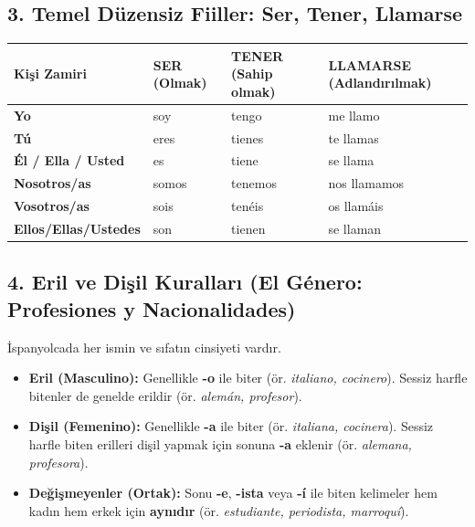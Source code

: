 \documentclass[12pt,a4paper]{article}
\begin{document}
\subsection{3. Temel Düzensiz Fiiller: Ser, Tener, Llamarse}
\begin{table}[h]
\centering
\begin{tabularx}{\textwidth}{l X X X}
\toprule
\textbf{Kişi Zamiri} & \textbf{SER (Olmak)} & \textbf{TENER (Sahip olmak)} & \textbf{LLAMARSE (Adlandırılmak)} \\
\midrule
\textbf{Yo} & soy & tengo & me llamo \\
\textbf{Tú} & eres & tienes & te llamas \\
\textbf{Él / Ella / Usted} & es & tiene & se llama \\
\textbf{Nosotros/as} & somos & tenemos & nos llamamos \\
\textbf{Vosotros/as} & sois & tenéis & os llamáis \\
\textbf{Ellos/Ellas/Ustedes} & son & tienen & se llaman \\
\bottomrule
\end{tabularx}
\end{table}

\subsection{4. Eril ve Dişil Kuralları (El Género: Profesiones y Nacionalidades)}
İspanyolcada her ismin ve sıfatın cinsiyeti vardır.
\begin{itemize}
    \item \textbf{Eril (Masculino):} Genellikle \textbf{-o} ile biter (ör. \textit{italiano, cocinero}). Sessiz harfle bitenler de genelde erildir (ör. \textit{alemán, profesor}).
    \item \textbf{Dişil (Femenino):} Genellikle \textbf{-a} ile biter (ör. \textit{italiana, cocinera}). Sessiz harfle biten erilleri dişil yapmak için sonuna \textbf{-a} eklenir (ör. \textit{alemana, profesora}).
    \item \textbf{Değişmeyenler (Ortak):} Sonu \textbf{-e}, \textbf{-ista} veya \textbf{-í} ile biten kelimeler hem kadın hem erkek için \textbf{aynıdır} (ör. \textit{estudiante, periodista, marroquí}).
\end{itemize}
\end{document}
